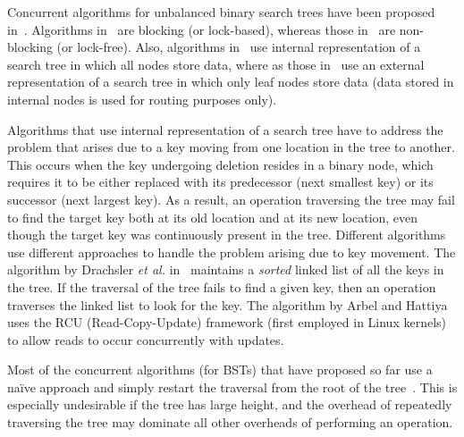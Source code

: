 Concurrent algorithms for unbalanced binary search trees have been proposed in~\cite{EllFat+:2010:PODC,HowJon:2012:SPAA,NatMit:2014:PPoPP,DraVec+:2014:PPoPP,EllFat+:2014:PODC,ChaDan+:2014:PODC,ArbAtt:2014:PODC}. Algorithms in~\cite{DraVec+:2014:PPoPP,ArbAtt:2014:PODC} are blocking (or lock-based), whereas those in~\cite{EllFat+:2010:PODC,HowJon:2012:SPAA,NatMit:2014:PPoPP,EllFat+:2014:PODC,ChaDan+:2014:PODC} are non-blocking (or lock-free). Also, algorithms in~\cite{HowJon:2012:SPAA,DraVec+:2014:PPoPP,ArbAtt:2014:PODC,ChaDan+:2014:PODC} use internal representation of a search tree in which all nodes store data, where as those in~\cite{EllFat+:2010:PODC,NatMit:2014:PPoPP,EllFat+:2014:PODC} use an external representation of  a search tree in which only leaf nodes store data (data stored in internal nodes is used for routing purposes only).

Algorithms that use internal representation of a search tree have to address the problem that arises due to a key moving from one location in the tree to another. This occurs when the key undergoing deletion resides in a binary node, which requires it to be either replaced with its predecessor (next smallest key) or its successor (next largest key). As a result, an operation traversing the tree may fail to find the target key both at its old location and at its new location, even though the target key was continuously present in the tree. Different algorithms use different approaches to handle the problem arising due to key movement. The algorithm by Drachsler \emph{et al.} in~\cite{DraVec+:2014:PPoPP} maintains a \emph{sorted} linked list of all the keys in the tree. If the traversal of the tree fails to find a given key, then an operation traverses the linked list to look for the key. The algorithm by Arbel and Hattiya~\cite{ArbAtt:2014:PODC} uses the RCU (Read-Copy-Update) framework (first employed in Linux kernels) to allow reads to occur concurrently with updates.

Most of the concurrent algorithms (for BSTs) that have proposed so far use a na{\"i}ve approach and simply restart the traversal from the root of the tree~\cite{EllFat+:2010:PODC,HowJon:2012:SPAA,NatMit:2014:PPoPP,DraVec+:2014:PPoPP,ArbAtt:2014:PODC}. This is especially undesirable if the tree has large height, and the overhead of repeatedly traversing the tree may dominate all other overheads of performing an operation.

